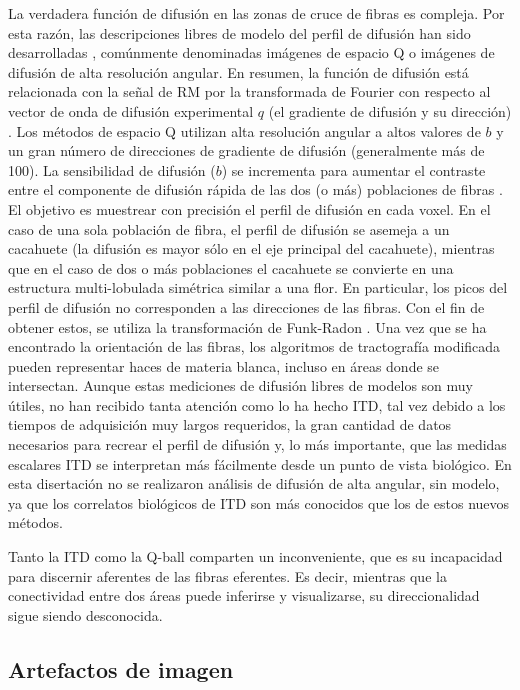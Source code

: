 La verdadera función de difusión en las zonas de cruce de fibras es compleja. Por esta razón, las descripciones libres de modelo del perfil de difusión han sido desarrolladas \cite{Alexander_2002,Tuch_2004}, comúnmente denominadas imágenes de espacio Q o imágenes de difusión de alta resolución angular. En resumen, la función de difusión está relacionada con la señal de RM por la transformada de Fourier con respecto al vector de onda de difusión experimental $q$ (el gradiente de difusión y su dirección) \cite{Stejskal_1965, Tuch_2004}. Los métodos de espacio Q utilizan alta resolución angular a altos valores de $b$ y un gran número de direcciones de gradiente de difusión (generalmente más de 100). La sensibilidad de difusión ($b$) se incrementa para aumentar el contraste entre el componente de difusión rápida de las dos (o más) poblaciones de fibras \cite{Tuch_2003}. El objetivo es muestrear con precisión el perfil de difusión en cada voxel. En el caso de una sola población de fibra, el perfil de difusión se asemeja a un cacahuete (la difusión es mayor sólo en el eje principal del cacahuete), mientras que en el caso de dos o más poblaciones el cacahuete se convierte en una estructura multi-lobulada simétrica similar a una flor. En particular, los picos del perfil de difusión no corresponden a las direcciones de las fibras. Con el fin de obtener estos, se utiliza  la transformación de Funk-Radon \cite{Tuch_2004}. Una vez que se ha encontrado la orientación de las fibras, los algoritmos de tractografía modificada pueden representar haces de materia blanca, incluso en áreas donde se intersectan. Aunque estas mediciones de difusión libres de modelos son muy útiles, no han recibido tanta atención como lo ha hecho ITD, tal vez debido a los tiempos de adquisición muy largos requeridos, la gran cantidad de datos necesarios para recrear el perfil de difusión y, lo más importante, que las medidas escalares ITD se interpretan más fácilmente desde un punto de vista biológico. En esta disertación no se realizaron análisis de difusión de alta angular, sin modelo, ya que los correlatos biológicos de ITD son más conocidos que los de estos nuevos métodos.

Tanto la ITD como la Q-ball comparten un inconveniente, que es su incapacidad para discernir aferentes de las fibras eferentes. Es decir, mientras que la conectividad entre dos áreas puede inferirse y visualizarse, su direccionalidad sigue siendo desconocida.

\subsection{Artefactos de imagen}
\label{sec:ArtefactosDWI}

